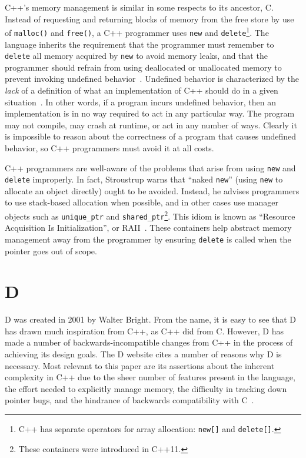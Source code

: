 \documentclass[finalcopy,short]{srpaper}
\begin{document}
C++'s memory management is similar in some respects to its ancestor, C. Instead
of requesting and returning blocks of memory from the free store by use of
\texttt{malloc()} and \texttt{free()}, a C++ programmer uses \texttt{new} and
\texttt{delete}\footnote{C++ has separate operators for array allocation:
    \texttt{new[]} and \texttt{delete[]}.}. The language inherits the
requirement that the programmer must remember to \texttt{delete} all memory
acquired by \texttt{new} to avoid memory leaks, and that the programmer should
refrain from using deallocated or unallocated memory to prevent invoking
undefined behavior~\cite{stroustrup2013the}. Undefined behavior is
characterized by the \textit{lack} of a definition of what an implementation of
C++ should do in a given situation~\cite{iso/iec}. In other words, if a program
incurs undefined behavior, then an implementation is in no way required to act
in any particular way. The program may not compile, may crash at runtime, or
act in any number of ways. Clearly it is impossible to reason about the
correctness of a program that causes undefined behavior, so C++ programmers
must avoid it at all costs.

C++ programmers are well-aware of the problems that arise from using
\texttt{new} and \texttt{delete} improperly. In fact, Stroustrup warns that
``naked \texttt{new}'' (using \texttt{new} to allocate an object directly)
ought to be avoided. Instead, he advises programmers to use stack-based
allocation when possible, and in other cases use manager objects such as
\texttt{unique\_ptr} and \texttt{shared\_ptr}\footnote{These containers were
    introduced in C++11.}. This idiom is known as ``Resource Acquisition Is
Initialization'', or RAII~\cite{stroustrup2013the}. These containers help
abstract memory management away from the programmer by ensuring \texttt{delete}
is called when the pointer goes out of scope.

\section{D}

D was created in 2001 by Walter Bright. From the name, it is easy to see that D
has drawn much inspiration from C++, as C++ did from C. However, D has made a
number of backwards-incompatible changes from C++ in the process of achieving
its design goals. The D website cites a number of reasons why D is necessary.
Most relevant to this paper are its assertions about the inherent complexity in
C++ due to the sheer number of features present in the language, the effort
needed to explicitly manage memory, the difficulty in tracking down pointer
bugs, and the hindrance of backwards compatibility with C~\cite{Doverview}.
\end{document}
